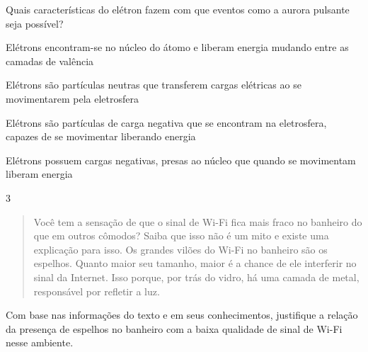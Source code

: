 Quais características do elétron fazem com que eventos como a aurora
pulsante seja possível?

\begin{escolha}
\item
  Elétrons encontram-se no núcleo do átomo e liberam energia mudando
  entre as camadas de valência
\item
  Elétrons são partículas neutras que transferem cargas elétricas ao se
  movimentarem pela eletrosfera
\item
  Elétrons são partículas de carga negativa que se encontram na
  eletrosfera, capazes de se movimentar liberando energia
\item
  Elétrons possuem cargas negativas, presas ao núcleo que quando se
  movimentam liberam energia
\end{escolha}


\num{3}

\begin{quote}  
Você tem a sensação de que o sinal de Wi-Fi fica mais fraco no
banheiro do que em outros cômodos? Saiba que isso não é um mito e
existe uma explicação para isso. Os grandes vilões do Wi-Fi no
banheiro são os espelhos. Quanto maior seu tamanho, maior é a chance
de ele interferir no sinal da Internet. Isso porque, por trás do
vidro, há uma camada de metal, responsável por refletir a luz.

\end{quote}

Com base nas informações do texto e em seus conhecimentos, justifique a
relação da presença de espelhos no banheiro com a baixa qualidade de
sinal de Wi-Fi nesse ambiente.

